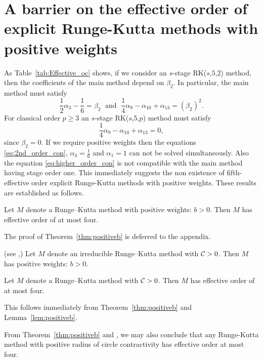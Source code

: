 \section{A barrier on the effective order of explicit Runge-Kutta methods with positive weights}\label{sec:ExRK_barrier}

\indent As Table~\ref{tab:Effective_oc} shows, if we consider an $s$-stage RK($s$,$5$,$2$) method, then the coefficients of the main method depend on $\beta_2$. In particular, the main method must satisfy
\begin{equation}\label{eq:2nd_order_con}
    \frac{1}{2}\alpha_3 - \frac{1}{6} = \beta_2 \; \text{ and } \; \frac{1}{4}\alpha_9 - \alpha_{10} + \alpha_{13} = (\beta_2)^2.
\end{equation}
For classical order $p \geq 3$ an $s$-stage RK($s$,$5$,$p$) method must satisfy
\begin{equation}\label{eq:higher_order_con}
    \frac{1}{4}\alpha_9- \alpha_{10} + \alpha_{13} = 0,
\end{equation}
since $\beta_2 = 0$.
If we require positive weights then the equations \eqref{eq:2nd_order_con},
$\alpha_4 = \frac{1}{6}$ and $\alpha_1 = 1$ can not be solved simultaneously.
Also the equation \eqref{eq:higher_order_con} is not compatible with the main method having stage order one.
This immediately suggests the non existence of fifth-effective order explicit Runge-Kutta methods with positive weights.
These results are established as follows.

\begin{theorem}\label{thm:positiveb}
    Let $M$ denote a Runge--Kutta method with positive weights: $b>0$.
    Then $M$ has effective order of at most four.
\end{theorem}
The proof of Theorem~\ref{thm:positiveb} is deferred to the appendix.

\begin{lemma}\label{lem:positiveb}(see \cite[Theorem~4.2]{Kraaijevanger1991},\cite[Lemma 4.2]{Ruuth2002})
Let $M$ denote an irreducible Runge--Kutta method with $\mathcal{C}>0$.  Then $M$ has positive weights:
$b>0$.
\end{lemma}

\begin{corollary}\label{cor:no-ssp-5}
    Let $M$ denote a Runge--Kutta method with $\mathcal{C}>0$.
    Then $M$ has effective order of at most four.
\end{corollary}
This follows immediately from Theorem~\ref{thm:positiveb} and Lemma~\ref{lem:positiveb}.

\begin{remark}
  From Theorem~\ref{thm:positiveb} and \cite[Theorem~4.1]{dahlquist2006}, we
  may also conclude that any Runge-Kutta method with positive radius of circle contractivity
  has effective order at most four.
\end{remark}


